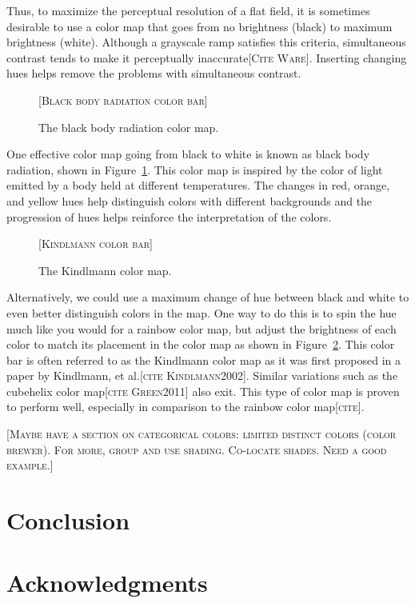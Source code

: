\documentclass[letterpaper,twocolumn,fleqn]{article}
\newcommand{\etal}{et al.\xspace}
\newcommand{\fix}[1]{{\color{red}\textsc{[#1]}}}
\begin{document}
Thus, to maximize the perceptual resolution of a flat field, it is
sometimes desirable to use a color map that goes from no brightness (black)
to maximum brightness (white). Although a grayscale ramp satisfies this
criteria, simultaneous contrast tends to make it perceptually
inaccurate\fix{Cite Ware}. Inserting changing hues helps remove the
problems with simultaneous contrast.

\begin{figure}[htb]
  \centering
  \fix{Black body radiation color bar}
  \caption{The black body radiation color map.}
  \label{fig:BlackBodyRadiationColorBar}
\end{figure}

One effective color map going from black to white is known as black
body radiation, shown in Figure~\ref{fig:BlackBodyRadiationColorBar}. This
color map is inspired by the color of light emitted by a body held at
different temperatures. The changes in red, orange, and yellow hues help
distinguish colors with different backgrounds and the progression of hues
helps reinforce the interpretation of the colors.

\begin{figure}[htb]
  \centering
  \fix{Kindlmann color bar}
  \caption{The Kindlmann color map.}
  \label{fig:KindlmannColorBar}
\end{figure}

Alternatively, we could use a maximum change of hue between black and white
to even better distinguish colors in the map. One way to do this is to spin
the hue much like you would for a rainbow color map, but adjust the
brightness of each color to match its placement in the color map as shown
in Figure~\ref{fig:KindlmannColorBar}. This color bar is often referred to
as the Kindlmann color map as it was first proposed in a paper by
Kindlmann, \etal\fix{cite Kindlmann2002}. Similar variations such as the
cubehelix color map\fix{cite Green2011} also exit. This type of color map
is proven to perform well, especially in comparison to the rainbow color
map\fix{cite}. 

\fix{Maybe have a section on categorical colors: limited distinct colors
  (color brewer). For more, group and use shading. Co-locate shades. Need a
  good example.}


\section{Conclusion}

\section{Acknowledgments} 
\end{document}
